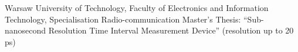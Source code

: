 %
%
%




\begin{scholarship}
					{Warsaw University of Technology, Faculty of Electronics and Information Technology, Specialisation Radio-communication
					\newline
					Master’s Thesis: “Sub-nanosecond Resolution Time Interval Measurement Device” (resolution up to 20 ps)}
\end{scholarship}
